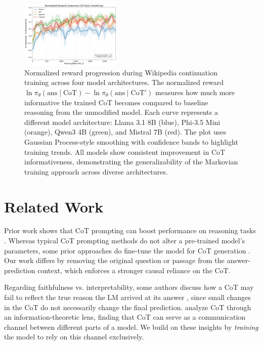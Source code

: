 \documentclass[letterpaper]{article} %
\begin{document}
\begin{figure}[t]
  \centering
    \includegraphics[width=0.43\textwidth]{Figures/combined_normalized_reward_gp_smoothed.png}
    \caption{Normalized reward progression during Wikipedia continuation training across four model architectures. The normalized reward $\ln \pi_\theta(\text{ans} \mid \text{CoT}) - \ln \pi_\theta(\text{ans} \mid \text{CoT}')$ measures how much more informative the trained CoT becomes compared to baseline reasoning from the unmodified model. Each curve represents a different model architecture: Llama 3.1 8B (blue), Phi-3.5 Mini (orange), Qwen3 4B (green), and Mistral 7B (red). The plot uses Gaussian Process-style smoothing with confidence bands to highlight training trends. All models show consistent improvement in CoT informativeness, demonstrating the generalizability of the Markovian training approach across diverse architectures.}
    \label{fig:loss}
\end{figure}

\section{Related Work}
\label{sec:related_work}

Prior work shows that CoT prompting can boost performance on reasoning tasks \citep{wei2022chain, nye2022show}.
Whereas typical CoT prompting methods do not alter a pre-trained model's parameters, some prior approaches do fine-tune the model for CoT generation \citep{eric_star2022, zelikman2024quietstar, deepseekai2025}. Our work differs by removing the original question or passage from the answer-prediction context, which enforces a stronger causal reliance on the CoT.

Regarding faithfulness vs. interpretability, some authors discuss how a CoT may fail to reflect the true reason the LM arrived at its answer \citep{lanham2023measuring, turpin2023language}, since small changes in the CoT do not necessarily change the final prediction. \citet{zhou2023understanding} analyze CoT through an information-theoretic lens, finding that CoT can serve as a communication channel between different parts of a model. We build on these insights by \emph{training} the model to rely on this channel exclusively.
\end{document}
